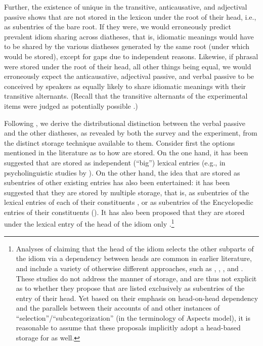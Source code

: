 \documentclass[output=paper]{langsci/langscibook}
\begin{document}
Further, the existence of unique  in the transitive, anticausative, and
adjectival passive shows that  are not stored in the lexicon under the
root of their head, i.e., as subentries of the bare root. If they were, we
would erroneously predict prevalent idiom sharing across diatheses, that is,
idiomatic meanings would have to be shared by the various diatheses generated
by the same root (under which  would be stored), except for gaps due to
independent reasons. Likewise, if phrasal  were stored under the root of
their head, all other things being equal, we would erroneously expect the
anticausative, adjectival passive, and verbal passive to be conceived by
speakers as equally likely to share idiomatic meanings with their transitive
alternants. (Recall that the transitive alternants of the experimental items
were judged as potentially possible .)

Following \textcite{HorSil2009,HorSil2019}, we derive the distributional
distinction between the verbal passive and the other diatheses, as revealed by
both the survey and the experiment, from the distinct storage technique
available to them. Consider first the options mentioned in the literature as to
how  are stored. On the one hand, it has been suggested that  are
stored as independent (``big'') lexical entries (e.g., in psycholinguistic
studies by \citealt{BobBel1973,SwiCut1979,Gibbs1980}). On the other hand, the
idea that  are stored as subentries of other existing entries has also
been entertained: it has been suggested that they are stored by multiple
storage, that is, as subentries of the lexical entries of each of their
constituents \citep{Everaert2010}, or as subentries of the Encyclopedic entries
of their constituents (\citealt{HarNoy1999}). It has also been proposed that
they are stored under the lexical entry of the head of the idiom only
\parencite{Baltin1989,HorSil2009}.\footnote{Analyses of  claiming that
    the head of the idiom selects the other subparts of the idiom via a
    dependency between heads are common in earlier literature, and include a
    variety of otherwise different approaches, such as \citet{Bresnan1982},
    \citet{Erbach1992}, \citet{KooSpo1991}, and \citet{OGrady1998}.  These
    studies do not address the manner of storage, and are thus not explicit as
    to whether they propose that  are listed exclusively as subentries of
    the entry of their head.  Yet based on their emphasis on head-on-head
    dependency and the parallels between their accounts of  and other
    instances of ``selection''/``subcategorization'' (in the terminology of
     Aspects model), it is reasonable to assume that these
proposals implicitly adopt a head-based storage for  as well.}
\end{document}
